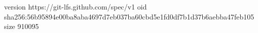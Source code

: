 version https://git-lfs.github.com/spec/v1
oid sha256:56b95894e00ba8aba4697d7eb037ba60cbd5e1fd0df7b1d37b6aebba47feb105
size 910095
